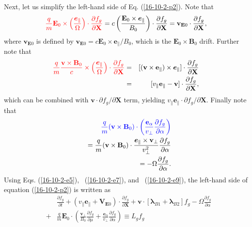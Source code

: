 \documentclass{llncs}
\newcommand{\tmcolor}[2]{{\color{#1}{#2}}}
\newcommand{\tmmathbf}[1]{\ensuremath{\boldsymbol{#1}}}
\begin{document}
Next, let us simplify the left-hand side of Eq. (\ref{16-10-2-p2}). Note that
\begin{equation}
  \label{16-10-2-e5} \tmcolor{red}{\frac{q}{m} \mathbf{E}_0 \times \left(
  \frac{\tmmathbf{e}_{\parallel}}{\Omega}  \right) \cdot \frac{\partial
  f_g}{\partial \mathbf{X}}} = c \left( \frac{\mathbf{E}_0 \times
  \tmmathbf{e}_{\parallel}}{B_0}  \right) \cdot \frac{\partial f_g}{\partial
  \mathbf{X}} =\mathbf{v}_{\mathbf{E}0} \cdot \frac{\partial f_g}{\partial
  \mathbf{X}},
\end{equation}
where $\mathbf{v}_{\mathbf{E}0}$ is defined by $\mathbf{v}_{\mathbf{E}0} =
c\mathbf{E}_0 \times \mathbf{e}_{\parallel} / B_0$, which is the $\mathbf{E}_0
\times \mathbf{B}_0$ drift. Further note that
\begin{eqnarray}
  \tmcolor{red}{\frac{q}{m}  \frac{\mathbf{v} \times \mathbf{B}_0}{c} \times
  \left( \frac{\tmmathbf{e}_{\parallel}}{\Omega}  \right) \cdot \frac{\partial
  f_g}{\partial \mathbf{X}}} & = & [(\mathbf{v} \times \mathbf{e}_{\parallel})
  \times \tmmathbf{e}_{\parallel}] \cdot \frac{\partial f_g}{\partial
  \mathbf{X}} \nonumber\\
  & = & [v_{\parallel} \mathbf{e}_{\parallel} -\mathbf{v}] \cdot
  \frac{\partial f_g}{\partial \mathbf{X}},  \label{16-10-2-e7}
\end{eqnarray}
which can be combined with $\mathbf{v} \cdot \partial f_g / \partial
\mathbf{X}$ term, yielding $v_{\parallel} \mathbf{e}_{\parallel} \cdot
\partial f_g / \partial \mathbf{X}$. Finally note that
\begin{eqnarray}
  &  & \tmcolor{blue}{\frac{q}{m}  (\mathbf{v} \times \mathbf{B}_0) \cdot
  \left( \frac{\mathbf{e}_{\alpha}}{v_{\perp}}  \frac{\partial f_g}{\partial
  \alpha} \right)} \nonumber\\
  &  & = \frac{q}{m}  (\mathbf{v} \times \mathbf{B}_0) \cdot
  \frac{\tmmathbf{e}_{\parallel} \times \mathbf{v}_{\perp}}{v_{\perp}^2} 
  \frac{\partial f_g}{\partial \alpha} \nonumber\\
  &  & = - \Omega \frac{\partial f_g}{\partial \alpha} .  \label{16-10-2-e9}
\end{eqnarray}
Using Eqs. (\ref{16-10-2-e5}), \ (\ref{16-10-2-e7}), and \ (\ref{16-10-2-e9}),
the left-hand side of equation (\ref{16-10-2-p2}) is written as
\begin{eqnarray}
  &  & \frac{\partial f_g}{\partial t} + (v_{\parallel}
  \mathbf{e}_{\parallel} +\mathbf{V}_{\mathbf{E}0}) \cdot \frac{\partial
  f_g}{\partial \mathbf{X}} +\mathbf{v} \cdot [\tmmathbf{\lambda}_{B 1}
  +\tmmathbf{\lambda}_{B 2}] f_g - \Omega \frac{\partial f_g}{\partial \alpha}
  \nonumber\\
  & + & \frac{q}{m} \mathbf{E}_0 \cdot \left( \frac{\mathbf{v}_{\perp}}{B_0} 
  \frac{\partial f_g}{\partial \mu} + \frac{\tmmathbf{e}_{\alpha}}{v_{\perp}} 
  \frac{\partial f_g}{\partial \alpha} \right) \equiv L_g f_g 
  \label{16-9-22-1b}
\end{eqnarray}
\end{document}
